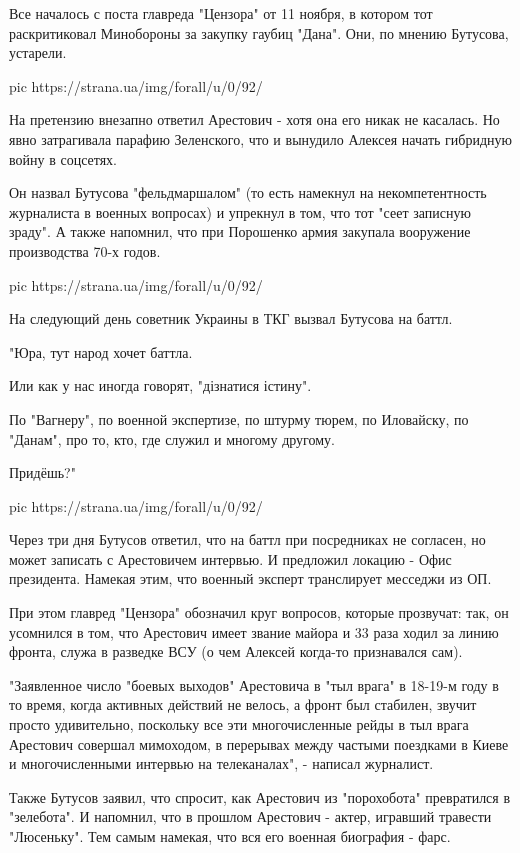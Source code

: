 Все началось с поста главреда "Цензора" от 11 ноября, в котором тот
раскритиковал Минобороны за закупку гаубиц "Дана". Они, по мнению
Бутусова, устарели.

\ifcmt
pic https://strana.ua/img/forall/u/0/92/%
\fi

На претензию внезапно ответил Арестович - хотя она его никак не касалась.
Но явно затрагивала парафию Зеленского, что и вынудило Алексея начать
гибридную войну в соцсетях. 

Он назвал Бутусова "фельдмаршалом" (то есть намекнул на некомпетентность
журналиста в военных вопросах) и упрекнул в том, что тот "сеет записную
зраду". А также напомнил, что при Порошенко армия закупала вооружение
производства 70-х годов. 

\ifcmt
pic https://strana.ua/img/forall/u/0/92/%
\fi

На следующий день советник Украины в ТКГ вызвал Бутусова на баттл.

"Юра, тут народ хочет баттла.

Или как у нас иногда говорят, "дізнатися істину".

По "Вагнеру", по военной экспертизе, по штурму тюрем, по Иловайску, по
"Данам", про то, кто, где служил и многому другому.

Придёшь?"

\ifcmt
pic https://strana.ua/img/forall/u/0/92/%
\fi

Через три дня Бутусов ответил, что на баттл при посредниках не согласен,
но может записать с Арестовичем интервью. И предложил локацию - Офис
президента. Намекая этим, что военный эксперт транслирует месседжи из ОП. 

При этом главред "Цензора" обозначил круг вопросов, которые прозвучат:
так, он усомнился в том, что Арестович имеет звание майора и 33 раза ходил
за линию фронта, служа в разведке ВСУ (о чем Алексей когда-то признавался
сам). 

"Заявленное число "боевых выходов" Арестовича в "тыл врага" в 18-19-м году
в то время, когда активных действий не велось, а фронт был стабилен,
звучит просто удивительно, поскольку все эти многочисленные рейды в тыл
врага Арестович совершал мимоходом, в перерывах между частыми поездками в
Киеве и многочисленными интервью на телеканалах", - написал журналист. 

Также Бутусов заявил, что спросит, как Арестович из "порохобота"
превратился в "зелебота". И напомнил, что в прошлом Арестович - актер,
игравший травести "Люсеньку". Тем самым намекая, что вся его военная
биография - фарс. 

